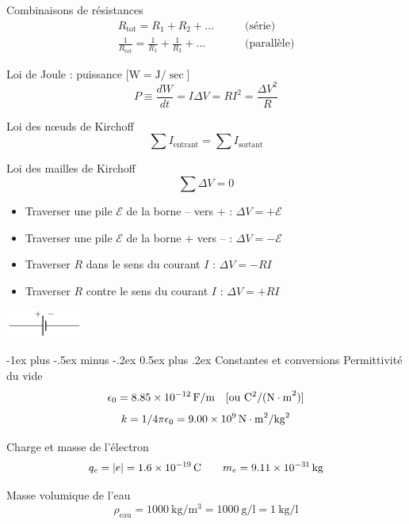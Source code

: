 \documentclass[10pt,landscape]{article}
\makeatletter
\renewcommand{\section}{\@startsection{section}{1}{0mm}%
                                {-1ex plus -.5ex minus -.2ex}%
                                {0.5ex plus .2ex}%
                                {\normalfont\large\bfseries}}
\newcommand{\emf}{\ensuremath{\mathcal{E}}}
\makeatother
\begin{document}
\begin{multicols}{3}
Combinaisons de résistances
\begin{align*}
R_\text{tot} = R_1 + R_2 + \dots \qquad & \text{(série)} \\
\frac{1}{R_\text{tot}} = \frac{1}{R_1} + \frac{1}{R_2} + \dots \qquad & \text{(parallèle)}
\end{align*}

Loi de Joule : puissance [$\si{\watt} = \si{\joule}/\si{\sec}$]
\[ P \equiv \frac{dW}{dt} = I \Delta V = R I^2  = \frac{\Delta V^2}{R}\]

Loi des nœuds de Kirchoff
\[ \sum I_\text{entrant} = \sum I_\text{sortant} \]

Loi des mailles de Kirchoff
\[ \sum \Delta V = 0 \]

\begin{itemize}
\item Traverser une pile $\emf$ de la borne -- vers + : $\Delta V  = +\emf$
\item Traverser une pile $\emf$ de la borne + vers -- : $\Delta V  = -\emf$
\item Traverser $R$ dans le sens du courant $I$ : $\Delta V  = -RI$
\item Traverser $R$ contre le sens du courant $I$ : $\Delta V  = +RI$
\end{itemize}

\begin{center}
	\includegraphics[width=25mm]{./phy1522/pile.png}
\end{center}

\hrulefill
\section{Constantes et conversions}
Permittivité du vide
\[ 	\epsilon_0 = \SI{8,85E-12}{{\farad}/{\meter}} \quad [\text{ou } \si{{\coulomb^2}/{(\newton\cdot\meter^2)}}] \]
\[	k = {1}/{4\pi\epsilon_0} = \SI{9,00E9}{\newton\cdot\meter^2/\kilogram^2}\]

Charge et masse de l'électron
\begin{gather*}
q_e = |e| = \SI{1,6E-19}{\coulomb}
\qquad m_e = \SI{9,11E-31}{\kilogram}
\end{gather*}

Masse volumique de l'eau
\[ \rho_\text{eau} = \SI{1000}{\kilogram/\meter^3} = \SI{1000}{\gram/\litre}  = \SI{1}{\kilogram/\litre} \]


\end{multicols}
\end{document}

